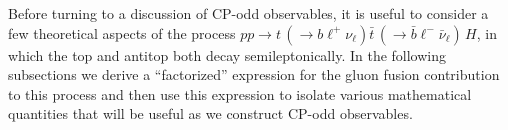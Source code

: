 \documentclass[aps,preprint,tightenlines,floatfix,superscriptaddress,nofootinbib,showpacs]{revtex4-1}
\def\tbar{\bar{t}}
\def\bbar{\bar{b}}
\def\nubar{{\bar{\nu}}_{\ell}}
\def\ppprocess{pp\to t\,\left(\rightarrow b {\ell}^+ \nu_{\ell}\right) \tbar\,\left(\rightarrow\bbar {\ell}^-\nubar\right)\,H}
\begin{document}
Before turning to a discussion of $\mathrm{CP}$-odd observables,
it is useful to consider a few theoretical aspects of
the process $\ppprocess$, in which the top and antitop both decay
semileptonically.
In the following subsections we derive a ``factorized''
expression for the gluon fusion contribution to this process
and then use this expression
to isolate various mathematical quantities
that will be useful as we construct $\mathrm{CP}$-odd observables.\par

\begin{center}
\begin{figure}[H]
\centering
\hspace*{0.05\textwidth}
\\[0.032\textwidth]
\hspace*{0.05\textwidth}

\end{figure}
\end{center}
\end{document}
